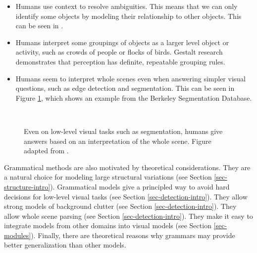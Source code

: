 \begin{itemize}
\item Humans use context to resolve ambiguities. \cite{visual-context}
  This means that we can only identify some objects by modeling their
  relationship to other objects. This can be seen in \cite{pop}.
\item Humans interpret some groupings of objects as a larger level
  object or activity, such as crowds of people or flocks of birds.
  Gestalt research demonstrates that perception has definite,
  repeatable grouping rules. \cite{gestalt}
\item Humans seem to interpret whole scenes even when answering
  simpler visual questions, such as edge detection and segmentation.
  This can be seen in Figure \ref{fig-bsd}, which shows an example
  from the Berkeley Segmentation Database. \cite{bsd}
\end{itemize}
\begin{figure}
  \centering
{}\\
\caption{Even on low-level visual tasks such as segmentation, humans
  give answers based on an interpretation of the whole scene. Figure
  adapted from \cite{bsd}.}
\label{fig-bsd}
\end{figure}

Grammatical methods are also motivated by theoretical
considerations. They are a natural choice for modeling large
structural variations (see Section \ref{sec-structure-intro}). Grammatical
models give a principled way to avoid hard decisions for low-level
visual tasks (see Section \ref{sec-detection-intro}). They allow strong models of
background clutter (see Section \ref{sec-detection-intro}). They allow whole
scene parsing (see Section \ref{sec-detection-intro}). They make it easy to
integrate models from other domains into visual models (see Section
\ref{sec-modules}). Finally, there are theoretical reasons why
grammars may provide better generalization than other models.


